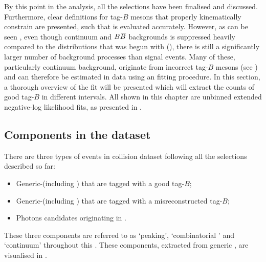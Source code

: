 By this point in the analysis, all the selections have been finalised and discussed.
Furthermore, clear definitions for tag-$B$ mesons that properly kinematically constrain \BtoXsgamma are presented, such that \EB is evaluated accurately.
However, as can be seen , even though continuum and $B\kern 0.18em\overline{\kern -0.18em B}{}$ backgrounds is suppressed heavily compared to the \EB distributions that was begun with (),
there is still a significantly larger number of background processes than \BtoXsgamma signal events.
Many of these, particularly continuum background, originate from incorrect tag-$B$ mesons (see ) and can therefore be estimated in data using an \Mbc fitting procedure.
In this section, a thorough overview of the \Mbc fit will be presented which will extract the counts of good tag-$B$ in different \EB intervals.
All shown in this chapter are unbinned extended negative-log likelihood fits, as presented in .


\subsection{Components in the dataset}\label{sec:fitting_components}

There are three types of events in \epem collision dataset following all the selections described so far:
\begin{itemize}
    \item Generic-\BB (including \BtoXsgamma) that are tagged with a good tag-$B$;
    \item Generic-\BB (including \BtoXsgamma) that are tagged with a misreconstructed tag-$B$;
    \item Photons candidates originating in \epem\ra\qqbar.
\end{itemize}
These three components are referred to as `peaking', `combinatorial \BB' and `continuum' throughout this .
These components, extracted from generic \MC, are visualised in .

